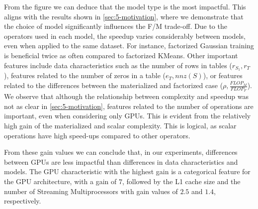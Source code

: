 From the figure we can deduce that the model type is the most impactful. This aligns with the results shown in \autoref{sec:5-motivation}, where we demonstrate that the choice of model significantly influences the F/M trade-off. Due to the operators used in each model, the speedup varies considerably between models, even when applied to the same dataset. For instance, factorized Gaussian training is beneficial twice as often compared to factorized KMeans. Other important features include data characteristics such as the number of rows in tables ($r_{S_1}, r_T$), features related to the number of zeros in a table ($e_T, nnz(S)$), or features related to the differences between the materialized and factorized case ($\rho, \frac{FLOP_M}{FLOP_F}$). We observe that although the relationship between complexity and speedup was not as clear in \autoref{sec:5-motivation}, features related to the number of operations are important, even when considering only GPUs. This is evident from the relatively high gain of the materialized and scalar complexity. This is logical, as scalar operations have high speed-ups compared to other operators.

From these gain values we can conclude that, in our experiments, differences between GPUs are less impactful than differences in data characteristics and models. The GPU characteristic with the highest gain is a categorical feature for the GPU architecture, with a gain of $7$, followed by the L1 cache size and the number of Streaming Multiprocessors with gain values of $2.5$ and $1.4$, respectively.


